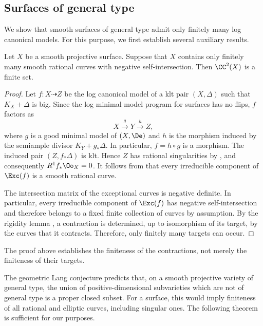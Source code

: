 \documentclass[12pt]{amsart}
\begin{document}
\subsection{Surfaces of general type}

We show that smooth surfaces of general type admit only finitely many
log canonical models. For this purpose, we first establish several
auxiliary results.

\begin{proposition}\label{prop:finite-negative-curves}
Let $X$ be a smooth projective surface. Suppose that $X$ contains only finitely many smooth rational curves with negative self-intersection. Then $\CC^2(X)$ is a finite set. 
\end{proposition}

\begin{proof}
Let $f\colon X\dashrightarrow Z$ be the log canonical model of a klt
pair $(X,\Delta)$ such that $K_X+\Delta$ is big. Since the log minimal
model program for surfaces has no flips, $f$ factors as
\[
X\xrightarrow{g}Y\xrightarrow{h}Z,
\]
where $g$ is a good minimal model of $(X,\De)$ and $h$ is the morphism induced by
the semiample divisor $K_Y+g_*\Delta$. In particular, $f=h\circ g$ is
a morphism. The induced pair $(Z,f_*\Delta)$ is klt. Hence $Z$ has
rational singularities by \cite[Theorem~5.22]{KM98}, and consequently
$R^1f_*\Oo_X=0$. It follows from \cite[Lemma~3.8, p.~30]{Bad01} that
every irreducible component of $\Exc(f)$ is a smooth rational curve.

The intersection matrix of the exceptional curves is negative
definite. In particular, every irreducible component of $\Exc(f)$ has
negative self-intersection and therefore belongs to a fixed finite
collection of curves by assumption. By the rigidity lemma
\cite[Lemma~1.15]{Deb01}, a contraction is determined, up to
isomorphism of its target, by the curves that it contracts. Therefore,
only finitely many targets can occur.
\end{proof}

\begin{remark}
The proof above establishes the finiteness of the contractions, not
merely the finiteness of their targets.
\end{remark}

The geometric Lang conjecture predicts that, on a smooth projective variety of general type, the union of positive-dimensional subvarieties which are not of general type is a proper closed subset. For a surface, this would imply finiteness of all rational and elliptic curves, including singular ones. The following theorem is sufficient for our purposes.
\end{document}
